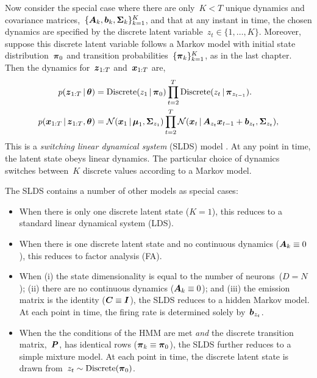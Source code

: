 Now consider the special case where there are only~$K<T$ unique dynamics
and covariance matrices,~${\{\boldsymbol{A}_k, \boldsymbol{b}_k, \boldsymbol{\Sigma}_k\}_{k=1}^K}$, and that at
any instant in time, the chosen dynamics are specified by the
discrete latent variable~${z_t \in \{1, \ldots, K\}}$. Moreover,
suppose this discrete latent variable follows a Markov model with 
initial state distribution~$\boldsymbol{\pi}_0$ and transition probabilities~$\{\boldsymbol{\pi}_{k}\}_{k=1}^K$,
as in the last chapter. Then the dynamics for~$\boldsymbol{z}_{1:T}$ and~$\boldsymbol{x}_{1:T}$
are,
\begin{align*}
  p(\boldsymbol{z}_{1:T} \,|\, \boldsymbol{\theta}) 
  &=
    \mathrm{Discrete}(z_1\,|\, \boldsymbol{\pi}_0)
    \prod_{t=2}^T \mathrm{Discrete}(z_t \,|\, \boldsymbol{\pi}_{z_{t-1}}).
  \\
  p(\boldsymbol{x}_{1:T} \,|\, \boldsymbol{z}_{1:T}, \boldsymbol{\theta})
  &= 
    \mathcal{N}(\boldsymbol{x}_1 \,|\, \boldsymbol{\mu}_1, \boldsymbol{\Sigma}_{z_1})
    \prod_{t=2}^T \mathcal{N}(\boldsymbol{x}_t \,|\, \boldsymbol{A}_{z_t} \boldsymbol{x}_{t-1} + \boldsymbol{b}_{z_t}, \boldsymbol{\Sigma}_{z_t}),
\end{align*}
This is a \emph{switching linear dynamical system} (SLDS) 
model \citep{murphy2012probabilistic, fox2009bayesian}. 
At any point in time, the latent state obeys linear dynamics.
The particular choice of dynamics switches between~$K$ discrete values
according to a Markov model.

The SLDS contains a number of other models as special cases:
\begin{itemize}
\item When there is only one discrete latent state ($K=1$), this
  reduces to a standard linear dynamical system (LDS).
  
\item When there is one discrete latent state and no continuous dynamics
  (${\boldsymbol{A}_k \equiv 0}$), this reduces to factor analysis (FA).

\item When (i) the state dimensionality is equal to the number of
  neurons~($D=N$); (ii) there are no continuous dynamics (${\boldsymbol{A}_k
    \equiv 0}$); and (iii) the emission matrix is the identity (${\boldsymbol{C}
    \equiv \boldsymbol{I}}$), the SLDS reduces to a hidden Markov model. At each
  point in time, the firing rate is determined solely
  by~$\boldsymbol{b}_{z_t}$.

\item When the the conditions of the HMM are met \emph{and} the
  discrete transition matrix,~$\boldsymbol{P}$, has identical rows (${\boldsymbol{\pi}_k
    \equiv \boldsymbol{\pi}_0}$), the SLDS further reduces to a simple mixture
  model. At each point in time, the discrete latent state is drawn
  from~${z_t \sim \mathrm{Discrete}(\boldsymbol{\pi}_0)}$.
\end{itemize}

